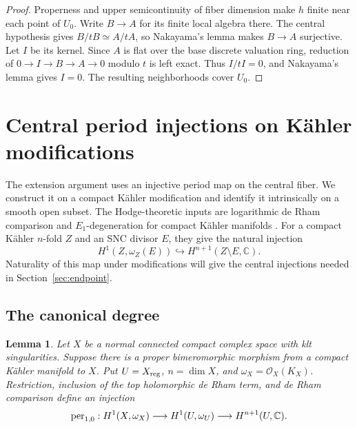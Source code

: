 \documentclass[11pt,a4paper]{article}
\numberwithin{equation}{section}
\newtheorem{lemma}[theorem]{Lemma}
\theoremstyle{definition}
\theoremstyle{remark}
\newcommand{\C}{\mathbb C}\newcommand{\Z}{\mathbb Z}
\newcommand{\OO}{\mathcal O}\newcommand{\cX}{\mathcal X}
\begin{document}
\begin{proof}
Properness and upper semicontinuity of fiber dimension make $h$
finite near each point of $U_0$. Write $B\to A$ for its finite
local algebra there. The central hypothesis gives
$B/tB\simeq A/tA$, so Nakayama's lemma makes $B\to A$ surjective.
Let $I$ be its kernel. Since $A$ is flat over the base discrete
valuation ring, reduction of $0\to I\to B\to A\to0$ modulo $t$
is left exact. Thus $I/tI=0$, and Nakayama's lemma gives $I=0$.
The resulting neighborhoods cover $U_0$.
\end{proof}

\section{Central period injections on Kähler modifications}
\label{sec:central-periods}

The extension argument uses an injective period map on the central
fiber. We construct it on a compact Kähler modification and identify
it intrinsically on a smooth open subset. The Hodge-theoretic inputs
are logarithmic de Rham comparison
\cite[Proposition~3.1.8]{Deligne1971} and $E_1$-degeneration for compact
Kähler manifolds \cite[Theorem~3.2]{LRW2019}. For a compact Kähler
$n$-fold $Z$ and an SNC divisor $E$, they give the natural injection
\begin{equation}\label{eq:log-period-edge}
 H^1(Z,\omega_Z(E))\hookrightarrow H^{n+1}(Z\setminus E,\C).
\end{equation}
Naturality of this map under modifications will give the central
injections needed in Section~\ref{sec:endpoint}.

\subsection{The canonical degree}

\begin{lemma}\label{lem:period-one}
Let $X$ be a normal connected compact complex space with klt singularities.
Suppose there is a proper bimeromorphic morphism from a compact Kähler
manifold to $X$. Put $U=X_{\mathrm{reg}}$, $n=\dim X$, and
$\omega_X=\OO_X(K_X)$. Restriction, inclusion of the top holomorphic
de Rham term, and de Rham comparison define an injection
\begin{equation}\label{eq:period-one}
 \per_{1,0}:H^1(X,\omega_X)
 \longrightarrow H^1(U,\omega_U)
 \longrightarrow H^{n+1}(U,\C).
\end{equation}
\end{lemma}
\end{document}
